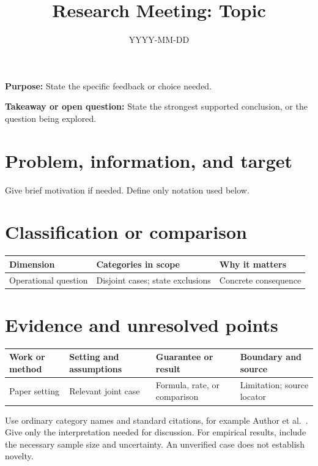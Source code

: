 \documentclass[11pt]{article}
\title{Research Meeting: Topic}
\author{}
\date{YYYY-MM-DD}
\begin{document}
\maketitle

\textbf{Purpose:} State the specific feedback or choice needed.

\textbf{Takeaway or open question:} State the strongest supported conclusion,
or the question being explored.

\section{Problem, information, and target}
Give brief motivation if needed. Define only notation used below.

\section{Classification or comparison}
\begin{tabularx}{\textwidth}{@{}>{\raggedright\arraybackslash}p{}YY@{}}
\toprule
Dimension & Categories in scope & Why it matters \\
\midrule
Operational question & Disjoint cases; state exclusions & Concrete consequence \\
\bottomrule
\end{tabularx}

\section{Evidence and unresolved points}
\begin{tabularx}{\textwidth}{@{}>{\raggedright\arraybackslash}p{}YYY@{}}
\toprule
Work or method & Setting and assumptions & Guarantee or result & Boundary and source \\
\midrule
Paper setting & Relevant joint case & Formula, rate, or comparison & Limitation; source locator \\
\bottomrule
\end{tabularx}

Use ordinary category names and standard citations, for example Author et al.~\cite{example}.
Give only the interpretation needed for discussion. For empirical results,
include the necessary sample size and uncertainty. An unverified case does not
establish novelty.
\end{document}
